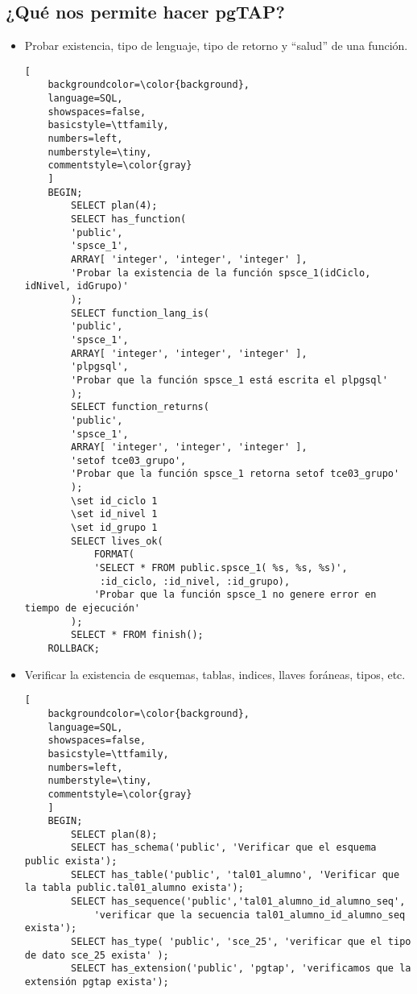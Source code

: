 \documentclass{article}
\begin{document}
\subsection{¿Qué nos permite hacer pgTAP?}
\begin{itemize}
    \item Probar existencia, tipo de lenguaje, tipo de retorno y ``salud'' de una función.
    \begin{lstlisting}[
    backgroundcolor=\color{background},
    language=SQL,
    showspaces=false,
    basicstyle=\ttfamily,
    numbers=left,
    numberstyle=\tiny,
    commentstyle=\color{gray}
    ]
    BEGIN;
        SELECT plan(4);
        SELECT has_function(
        'public',
        'spsce_1',
        ARRAY[ 'integer', 'integer', 'integer' ],
        'Probar la existencia de la función spsce_1(idCiclo, idNivel, idGrupo)'
        );
        SELECT function_lang_is(
        'public',
        'spsce_1',
        ARRAY[ 'integer', 'integer', 'integer' ],
        'plpgsql',
        'Probar que la función spsce_1 está escrita el plpgsql'
        );
        SELECT function_returns(
        'public',
        'spsce_1',
        ARRAY[ 'integer', 'integer', 'integer' ], 
        'setof tce03_grupo',
        'Probar que la función spsce_1 retorna setof tce03_grupo'
        );
        \set id_ciclo 1
        \set id_nivel 1
        \set id_grupo 1
        SELECT lives_ok(
            FORMAT(
            'SELECT * FROM public.spsce_1( %s, %s, %s)',
             :id_ciclo, :id_nivel, :id_grupo),
            'Probar que la función spsce_1 no genere error en tiempo de ejecución'
        );
        SELECT * FROM finish();
    ROLLBACK;
    \end{lstlisting}
    \item Verificar la existencia de esquemas, tablas, indices, llaves foráneas, tipos, etc.
    \begin{lstlisting}[
    backgroundcolor=\color{background},
    language=SQL,
    showspaces=false,
    basicstyle=\ttfamily,
    numbers=left,
    numberstyle=\tiny,
    commentstyle=\color{gray}
    ]
    BEGIN;
        SELECT plan(8);
        SELECT has_schema('public', 'Verificar que el esquema public exista');
        SELECT has_table('public', 'tal01_alumno', 'Verificar que la tabla public.tal01_alumno exista');
        SELECT has_sequence('public','tal01_alumno_id_alumno_seq', 
            'verificar que la secuencia tal01_alumno_id_alumno_seq exista');
        SELECT has_type( 'public', 'sce_25', 'verificar que el tipo de dato sce_25 exista' );
        SELECT has_extension('public', 'pgtap', 'verificamos que la extensión pgtap exista');

\end{lstlisting}
\end{itemize}
\end{document}
